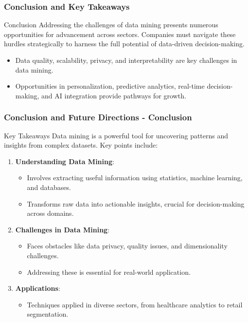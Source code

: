 \documentclass[aspectratio=169]{beamer}
\begin{document}
\begin{frame}[fragile]
    \frametitle{Conclusion and Key Takeaways}
    \begin{block}{Conclusion}
        Addressing the challenges of data mining presents numerous opportunities for advancement across sectors. Companies must navigate these hurdles strategically to harness the full potential of data-driven decision-making.
    \end{block}
    
    \begin{itemize}
        \item Data quality, scalability, privacy, and interpretability are key challenges in data mining.
        \item Opportunities in personalization, predictive analytics, real-time decision-making, and AI integration provide pathways for growth.
    \end{itemize}
\end{frame}

\begin{frame}[fragile]
    \frametitle{Conclusion and Future Directions - Conclusion}
    \begin{block}{Key Takeaways}
        Data mining is a powerful tool for uncovering patterns and insights from complex datasets. Key points include:
    \end{block}
    \begin{enumerate}
        \item \textbf{Understanding Data Mining}:
        \begin{itemize}
            \item Involves extracting useful information using statistics, machine learning, and databases.
            \item Transforms raw data into actionable insights, crucial for decision-making across domains.
        \end{itemize}
        
        \item \textbf{Challenges in Data Mining}:
        \begin{itemize}
            \item Faces obstacles like data privacy, quality issues, and dimensionality challenges.
            \item Addressing these is essential for real-world application.
        \end{itemize}
        
        \item \textbf{Applications}:
        \begin{itemize}
            \item Techniques applied in diverse sectors, from healthcare analytics to retail segmentation.
        \end{itemize}
    \end{enumerate}
\end{frame}
\end{document}
